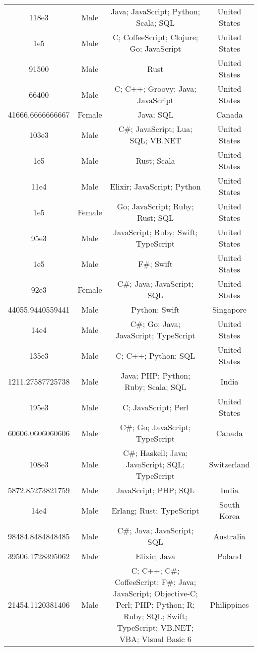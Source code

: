 \begin{center}
\begin{tabular}{ |c|c|c|c| }
118e3  &  Male  &  Java; JavaScript; Python; Scala; SQL  &  United States  \\ 
1e5  &  Male  &  C; CoffeeScript; Clojure; Go; JavaScript  &  United States  \\ 
91500  &  Male  &  Rust  &  United States  \\ 
66400  &  Male  &  C; C++; Groovy; Java; JavaScript  &  United States  \\ 
41666.6666666667  &  Female  &  Java; SQL  &  Canada  \\ 
103e3  &  Male  &  C\#; JavaScript; Lua; SQL; VB.NET  &  United States  \\ 
1e5  &  Male  &  Rust; Scala  &  United States  \\ 
11e4  &  Male  &  Elixir; JavaScript; Python  &  United States  \\ 
1e5  &  Female  &  Go; JavaScript; Ruby; Rust; SQL  &  United States  \\ 
95e3  &  Male  &  JavaScript; Ruby; Swift; TypeScript  &  United States  \\ 
1e5  &  Male  &  F\#; Swift  &  United States  \\ 
92e3  &  Female  &  C\#; Java; JavaScript; SQL  &  United States  \\ 
44055.9440559441  &  Male  &  Python; Swift  &  Singapore  \\ 
14e4  &  Male  &  C\#; Go; Java; JavaScript; TypeScript  &  United States  \\ 
135e3  &  Male  &  C; C++; Python; SQL  &  United States  \\ 
1211.27587725738  &  Male  &  Java; PHP; Python; Ruby; Scala; SQL  &  India  \\ 
195e3  &  Male  &  C; JavaScript; Perl  &  United States  \\ 
60606.0606060606  &  Male  &  C\#; Go; JavaScript; TypeScript  &  Canada  \\ 
108e3  &  Male  &  C\#; Haskell; Java; JavaScript; SQL; TypeScript  &  Switzerland  \\ 
5872.85273821759  &  Male  &  JavaScript; PHP; SQL  &  India  \\ 
14e4  &  Male  &  Erlang; Rust; TypeScript  &  South Korea  \\ 
98484.8484848485  &  Male  &  C\#; Java; JavaScript; SQL  &  Australia  \\ 
39506.1728395062  &  Male  &  Elixir; Java  &  Poland  \\ 
21454.1120381406  &  Male  &  C; C++; C\#; CoffeeScript; F\#; Java; JavaScript; Objective-C; Perl; PHP; Python; R; Ruby; SQL; Swift; TypeScript; VB.NET; VBA; Visual Basic 6  &  Philippines  \\ 

\end{tabular}
\end{center}
